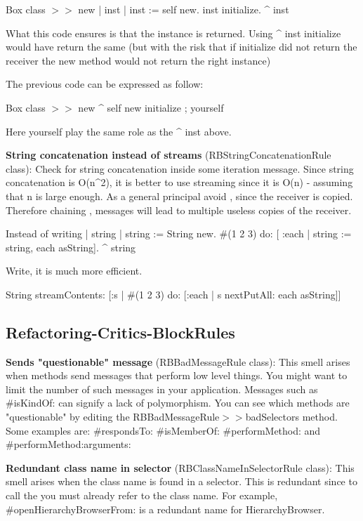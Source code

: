 	Box class $>>$ new
		| inst | 
		inst := self new.
		inst initialize. 
		^ inst
		
	What this code ensures is that the instance is returned. Using ^ inst initialize would have 
	return the same (but with the risk that if initialize did not return the receiver the new method would not return the right instance)
	
	The previous code can be expressed as follow:
	
	Box class $>>$ new
		^ self new initialize ; yourself 
		
	Here yourself play the same role as the ^ inst above. 
	
	

\textbf{String concatenation instead of streams} (RBStringConcatenationRule class): Check for string concatenation inside some iteration message. Since string concatenation is O(n^2), it is better to use streaming since it is O(n) - assuming that n is large enough. As a general principal avoid , since the receiver is copied. Therefore chaining , messages will lead to multiple useless copies of the receiver. 

Instead of writing
	| string | 
	string := String new.
	\#(1 2 3) do: [ :each |
		string := string, each asString].
	^ string

Write, it is much more efficient.

	String streamContents: [:s | 
		\#(1 2 3)  do: [:each | s nextPutAll: each asString]]

\subsection{Refactoring-Critics-BlockRules}
\textbf{Sends "questionable" message} (RBBadMessageRule class): This smell arises when methods send messages that perform low level things. You might want to limit the number of such messages in your application. Messages such as \#isKindOf: can signify a lack of polymorphism. You can see which methods are "questionable" by editing the RBBadMessageRule$>>$badSelectors method. Some examples are: \#respondsTo: \#isMemberOf: \#performMethod: and \#performMethod:arguments:

\textbf{Redundant class name in selector} (RBClassNameInSelectorRule class): This smell arises when the class name is found in a selector. This is redundant since to call the you must already refer to the class name. For example, \#openHierarchyBrowserFrom: is a redundant name for HierarchyBrowser.

